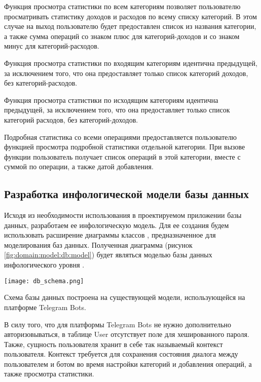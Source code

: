Функция просмотра статистики по всем категориям позволяет пользователю просматривать статистику доходов и расходов по всему списку категорий. В этом случае на выход пользователю будет предоставлен список из названия категории, а также сумма операций со знаком плюс для категорий-доходов и со знаком минус для категорий-расходов.

Функция просмотра статистики по входящим категориям идентична предыдущей, за исключением того, что она предоставляет только список категорий доходов, без категорий-расходов.

Функция просмотра статистики по исходящим категориям идентична предыдущей, за исключением того, что она предоставляет только список категорий расходов, без категорий-доходов.

Подробная статистика со всеми операциями предоставляется пользователю функцией просмотра подробной статистики отдельной категории. При вызове функции пользователь получает список операций в этой категории, вместе с суммой по операции, а также датой добавления.

\subsection{Разработка инфологической модели базы данных}
\label{sec:domain:model:db}

Исходя из необходимости использования в проектируемом приложении базы данных, разработаем ее инфологическую модель. Для ее создания будем использовать расширение диаграммы классов \uml, предназначенное для моделирования баз данных. Полученная диаграмма (рисунок \ref{fig:domain:model:db:model}) будет являться моделью базы данных инфологического уровня \cite{kulikov_db_workbook}.

\begin{sidewaysfigure}
\centering
	\texttt{[image: db\_schema.png]}
	\caption{Инфологическая модель базы данных}
	\label{fig:domain:model:db:model}
\end{sidewaysfigure}

Схема базы данных построена на существующей модели, использующейся на платформе Telegram Bots.

В силу того, что для платформы Telegram Bots не нужно дополнительно авторизовываться, в таблице User отсутствует поле для хешированного пароля. Также, сущность пользователя хранит в себе так называемый контекст пользователя. Контекст требуется для сохранения состояния диалога между пользователем и ботом во время настройки категорий и добавления операций, а также просмотра статистики.

